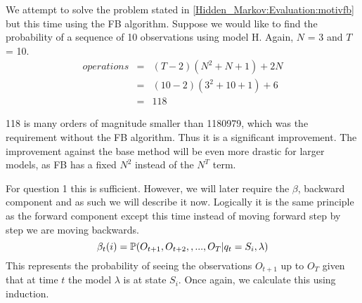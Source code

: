     \begin{example}
        \label{Hidden_Markov:Evaluation:motivfb2}
        We attempt to solve the problem stated in \ref{Hidden_Markov:Evaluation:motivfb} but this time using the FB algorithm. Suppose we would like to find the probability of a sequence of 10 observations using model H. Again, $N$ = 3 and $T$ = 10. 
        \begin{eqnarray}
            operations & = & (T-2)(N^2 + N + 1) + 2N \\
                    & = & (10-2)(3^2 + 10 + 1) + 6\\
                    & = & 118
        \end{eqnarray}

        118 is many orders of magnitude smaller than 1180979, which was the requirement without the FB algorithm. Thus it is a significant improvement. The improvement against the base method will be even more drastic for larger models, as FB has a fixed $N^2$ instead of the $N^T$ term.  
    \end{example}


    For question 1 this is sufficient. However, we will later require the $\beta$, backward component and as such we will describe it now. Logically it is the same principle as the forward component except this time instead of moving forward step by step we are moving backwards.
    \begin{equation}
        \label{Hidden_Markov:Evaluation:Forward_Backward_Algorithm:Beta}
        \beta_t(i) = \mathbb{P} (O_{t+1},O_{t+2},,...,O_T | q_t=S_i, \lambda)
    \end{equation}
    This represents the probability of seeing the observations $O_{t+1}$ up to $O_T$ given that at time $t$ the model $\lambda$ is at state $S_i$. Once again, we calculate this using induction.

